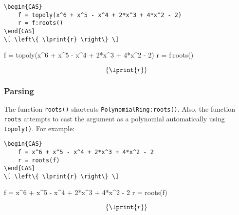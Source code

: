 \documentclass{article}
\begin{document}
\begin{codebox}[]
    \begin{verbatim}
\begin{CAS}
    f = topoly(x^6 + x^5 - x^4 + 2*x^3 + 4*x^2 - 2)
    r = f:roots()
\end{CAS}
\[ \left\{ \lprint{r} \right\} \] 
\end{verbatim}
\tcblower
\begin{CAS}
    f = topoly(x^6 + x^5 - x^4 + 2*x^3 + 4*x^2 - 2)
    r = f:roots()
\end{CAS}
\[ \left\{ \lprint{r} \right\} \] 
\end{codebox}

\subsubsection*{Parsing}

The function \texttt{roots()} shortcuts \texttt{PolynomialRing:roots()}. Also, the function \texttt{roots} attempts to cast the argument as a polynomial automatically using \texttt{topoly()}. For example:

\begin{codebox}[]
    \begin{verbatim}
\begin{CAS}
    f = x^6 + x^5 - x^4 + 2*x^3 + 4*x^2 - 2
    r = roots(f)
\end{CAS}
\[ \left\{ \lprint{r} \right\} \] 
\end{verbatim}
\tcblower        
    \begin{CAS}
        f = x^6 + x^5 - x^4 + 2*x^3 + 4*x^2 - 2
        r = roots(f)
    \end{CAS}
    \[ \left\{ \lprint{r} \right\} \] 
\end{codebox}
\end{document}
